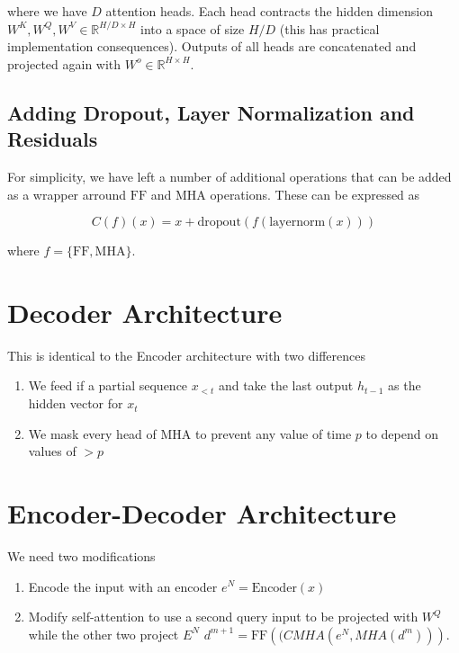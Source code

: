 where we have $D$ attention heads. Each head contracts the hidden dimension $W^K, W^Q, W^V \in \mathbb{R}^{H / D \times H}$ into a space of size $H / D$ (this has practical implementation consequences). Outputs of all heads are concatenated and projected again with $W^o \in \mathbb{R}^{H \times H}$.

\subsection{Adding Dropout, Layer Normalization and Residuals}

For simplicity, we have left a number of additional operations that can be added as a wrapper arround $\mathrm{FF}$ and $\mathrm{MHA}$ operations. These can be expressed as

\begin{equation}
C(f)(x) = x + \mathrm{dropout}(f(\mathrm{layernorm}(x)))
\end{equation}

where $f = \{\mathrm{FF}, \mathrm{MHA}\}$.


\section{Decoder Architecture}

This is identical to the Encoder architecture with two differences

\begin{enumerate}
\item We feed if a partial sequence $x_{<t}$ and take the last output $h_{t-1}$ as the hidden vector for $x_t$
\item We mask every head of $\mathrm{MHA}$ to prevent any value of time $p$ to depend on values of $>p$
\end{enumerate}

\section{Encoder-Decoder Architecture}

We need two modifications

\begin{enumerate}
\item Encode the input with an encoder $e^N = \mathrm{Encoder}(x)$
\item Modify self-attention to use a second query input to be projected with $W^Q$ while the other two project $E^N$ $d^{m+1} = \mathrm{FF}(\mathrm(CMHA(e^N, MHA(d^m))).$
\end{enumerate}

